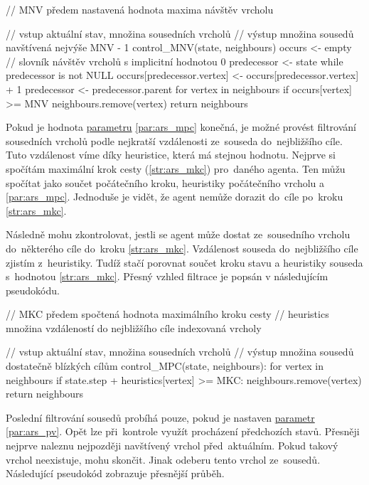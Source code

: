 \begin{code}[fontsize=\footnotesize]
// MNV předem nastavená hodnota maxima návštěv vrcholu

// vstup aktuální stav, množina sousedních vrcholů
// výstup množina sousedů navštívená nejvýše MNV - 1
control_MNV(state, neighbours)
  occurs <- empty // slovník návštěv vrcholů s implicitní hodnotou 0
  predecessor <- state
  while predecessor is not NULL
    occurs[predecessor.vertex] <- occurs[predecessor.vertex] + 1
    predecessor <- predecessor.parent
  for vertex in neighbours
    if occurs[vertex] >= MNV
      neighbours.remove(vertex)
  return neighbours
\end{code}

Pokud je hodnota \hyperref[subsubsec:ars_parametry]{parametru} \ref{par:ars_mpc} konečná,
je možné provést filtrování sousedních vrcholů podle nejkratší vzdálenosti ze~souseda do~nejbližšího cíle.
Tuto vzdálenost víme díky heuristice, která má stejnou hodnotu.
Nejprve si spočítám maximální krok cesty (\ref{str:ars_mkc}) pro~daného agenta.
Ten můžu spočítat jako součet počátečního kroku, heuristiky počátečního vrcholu a \ref{par:ars_mpc}.
Jednoduše je vidět, že agent nemůže dorazit do~cíle po~kroku \ref{str:ars_mkc}.

Následně mohu zkontrolovat, jestli se agent může dostat ze~sousedního vrcholu
do~některého cíle do~kroku \ref{str:ars_mkc}.
Vzdálenost souseda do~nejbližšího cíle zjistím z~heuristiky.
Tudíž stačí porovnat součet kroku stavu a heuristiky souseda s~hodnotou \ref{str:ars_mkc}.
Přesný vzhled filtrace je popsán v následujícím pseudokódu.

\begin{code}[fontsize=\footnotesize]
// MKC předem spočtená hodnota maximálního kroku cesty
// heuristics množina vzdáleností do nejbližšího cíle indexovaná vrcholy

// vstup aktuální stav, množina sousedních vrcholů
// výstup množina sousedů dostatečně blízkých cílům
control_MPC(state, neighbours):
  for vertex in neighbours
    if state.step + heuristics[vertex] >= MKC:
      neighbours.remove(vertex)
  return neighbours
\end{code}

Poslední filtrování sousedů probíhá pouze, pokud je nastaven
\hyperref[subsubsec:ars_parametry]{parametr} \ref{par:ars_pv}.
Opět lze při~kontrole využít procházení předchozích stavů.
Přesněji nejprve naleznu nejpozději navštívený vrchol před~aktuálním.
Pokud takový vrchol neexistuje, mohu skončit.
Jinak odeberu tento vrchol ze~sousedů.
Následující pseudokód zobrazuje přesnější průběh.

